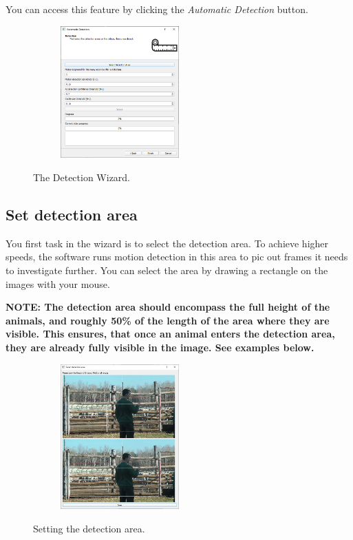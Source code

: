 \documentclass[10pt,a4paper,oneside]{report}             %
\begin{document}
You can access this feature by clicking the \textit{Automatic Detection} button.

\begin{figure}[H]
	\centering
	\begin{subfigure}{\textwidth}
		\centering 
		\includegraphics[width=0.5\textwidth]{./images/AutoDetect.png}
	\end{subfigure}
	\caption[]
	{\small  The Detection Wizard.}
\end{figure} 

\subsection{Set detection area}

You first task in the wizard is to select the detection area. To achieve higher speeds, the software runs motion detection in this area to pic out frames it needs to investigate further. You can select the area by drawing a rectangle on the images with your mouse. 

\textbf{NOTE: The detection area should encompass the full height of the animals, and roughly 50\% of the length of the area where they are visible. This ensures, that once an animal enters the detection area, they are already fully visible in the image. See examples below.}

\begin{figure}[H]
	\centering
	\begin{subfigure}{\textwidth}
		\centering 
		\includegraphics[width=0.5\textwidth]{./images/DetArea.jpg}
	\end{subfigure}
	\caption[]
	{\small  Setting the detection area.}
\end{figure} 
\end{document}
